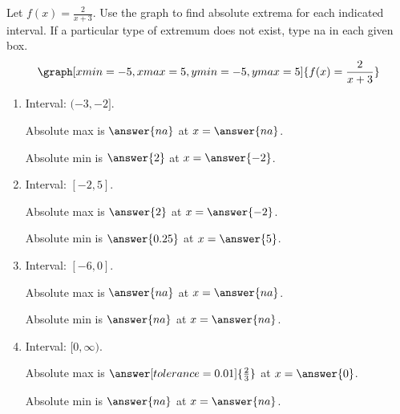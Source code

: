 \documentclass{ximera}
\begin{document}
\begin{problem}\label{prob:240quiz13prob2}
Let $f(x)=\frac{2}{x+3}$.  Use the graph to find absolute extrema for each indicated interval.  If a particular type of extremum does not exist, type na in each given box.
\[
\graph[xmin=-5,xmax=5,ymin=-5,ymax=5]{f(x)=\frac{2}{x+3}} 
\]

\begin{enumerate}
    \item Interval: $(-3, -2]$.
    
    Absolute max is $\answer{na}$ at $x=\answer{na}$.
    
    Absolute min is $\answer{2}$ at $x=\answer{-2}$.
    
    \item Interval: $[-2, 5]$.
    
    Absolute max is $\answer{2}$ at $x=\answer{-2}$.
    
    Absolute min is $\answer{0.25}$ at $x=\answer{5}$.
    
    \item Interval: $[-6, 0]$.
    
    Absolute max is $\answer{na}$ at $x=\answer{na}$.
    
    Absolute min is $\answer{na}$ at $x=\answer{na}$.
    
    \item Interval: $[0, \infty)$.
    
    Absolute max is $\answer[tolerance=0.01]{\frac{2}{3}}$ at $x=\answer{0}$.
    
    Absolute min is $\answer{na}$ at $x=\answer{na}$.
\end{enumerate}
\end{problem}
\end{document}
